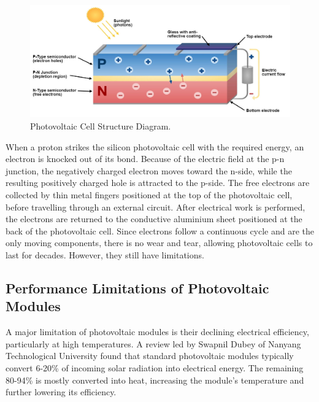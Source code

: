 \begin{figure}[ht]
    \centering
    \includegraphics[width=1\textwidth]{Figures/photovoltaic_cell_diagram.jpg}
    \caption{Photovoltaic Cell Structure Diagram. \cite{Gupta2020SolarVehicle}}
    \label{fig:photovoltaic_cell_diagram}
\end{figure}
\FloatBarrier

When a proton strikes the silicon photovoltaic cell with the required energy, an electron is knocked out of its bond. Because of the electric field at the p-n junction, the negatively charged electron moves toward the n-side, while the resulting positively charged hole is attracted to the p-side. The free electrons are collected by thin metal fingers positioned at the top of the photovoltaic cell, before travelling through an external circuit. After electrical work is performed, the electrons are returned to the conductive aluminium sheet positioned at the back of the photovoltaic cell. Since electrons follow a continuous cycle and are the only moving components, there is no wear and tear, allowing photovoltaic cells to last for decades. \cite{TED-Ed2016HowKomp} However, they still have limitations.\vspace{0.5em}

\pagebreak
\subsection{Performance Limitations of Photovoltaic Modules}
A major limitation of photovoltaic modules is their declining electrical efficiency, particularly at high temperatures. A review led by Swapnil Dubey of Nanyang Technological University found that standard photovoltaic modules typically convert 6-20\% of incoming solar radiation into electrical energy. The remaining 80-94\% is mostly converted into heat, increasing the module’s temperature and further lowering its efficiency. \cite{Dubey2013TemperatureReview}\vspace{0.5em}

